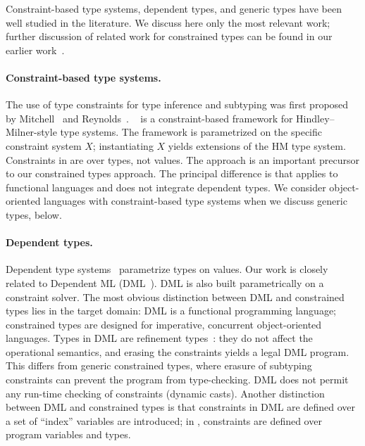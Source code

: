 Constraint-based type systems, dependent types, and generic types
have been well studied in the literature.
We discuss here only the most relevant work; further discussion of
related work for constrained types can be found in our earlier
work~\cite{constrained-types}.

\paragraph{Constraint-based type systems.}

The use of type constraints for type inference and subtyping was
first proposed by
Mitchell~\cite{mitchell84} and 
Reynolds~\cite{reynolds85}.  
\hmx~\cite{sulzmann97type} is a constraint-based framework for
Hindley--Milner-style type systems.  The framework is parametrized on
the specific constraint system $X$; instantiating $X$ yields
extensions of the HM type system.  Constraints in \hmx{} are over
types, not values. The \hmx{} approach is an important precursor to
our constrained types approach. The principal difference is that
\hmx{} applies to functional languages and does not integrate
dependent types.
We consider object-oriented languages with constraint-based type systems when 
we discuss generic types, below.

\paragraph{Dependent types.}

Dependent type
systems~\cite{xi99dependent,epigram,cayenne}
param\-etrize types on values.
Our work is closely related to Dependent ML (DML~\cite{xi99dependent}).
DML is also built
parametrically on a constraint solver.
The most obvious distinction between DML and constrained types
lies in the target
domain: DML is a functional programming language;
constrained types are designed for imperative, concurrent
object-oriented languages. 
Types in DML are refinement types~\cite{refinement-types}:
they do not affect the operational semantics, and erasing the
constraints yields a legal DML program.  This differs from
generic constrained
types, where erasure of subtyping constraints can prevent the program from
type-checking.
DML does not permit any run-time checking of constraints
(dynamic casts).
Another distinction between DML and constrained types
is that constraints in DML are
defined over a set of ``index'' variables are introduced; in \Xten, constraints
are defined over program variables and types.

